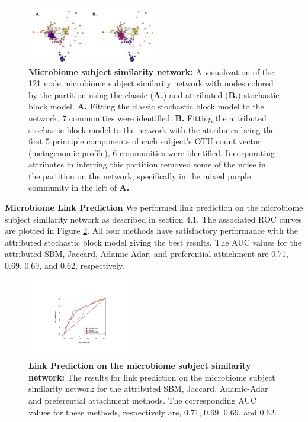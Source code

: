 \documentclass[10pt,journal,compsoc]{IEEEtran}
\begin{document}
\begin{figure}[h!]
\begin{center}
\includegraphics[width=0.5\textwidth]{MicrobiomeNets_Dec12.pdf}
\caption{{\bf Microbiome subject similarity network:} A visualization of the 121 node microbiome subject similarity network with nodes colored by the partition using the classic ({\bf A.}) and attributed ({\bf B.}) stochastic block model. {\bf A.} Fitting the classic stochastic block model to the network, 7 communities were identified. {\bf B.} Fitting the attributed stochastic block model to the network with the attributes being the first 5 principle components of each subject's OTU count vector (metagenomic profile), 6 communities were identified. Incorporating attributes in inferring this partition removed some of the noise in the partition on the network, specifically in the mixed purple community in the left of {\bf A.}}
\label{Fig4}
\end{center}
\end{figure}

{\bf Microbiome Link Prediction}
We performed link prediction on the microbiome subject similarity network as described in section 4.1. The associated ROC curves are plotted in Figure \ref{Fig5}. All four methods have satisfactory performance with the attributed stochastic block model giving the best results. The AUC values for the attributed SBM, Jaccard, Adamic-Adar, and preferential attachment are 0.71, 0.69, 0.69, and 0.62, respectively. 
 
\begin{figure}
\begin{center}
\includegraphics[width=0.4\textwidth]{ROC_Microbiome.pdf}
\caption{{\bf Link Prediction on the microbiome subject similarity network:} The results for link prediction on the microbiome subject similarity network for the attributed SBM, Jaccard, Adamic-Adar and preferential attachment methods. The corresponding AUC values for these methods, respectively are, 0.71, 0.69, 0.69, and 0.62.}
\label{Fig5}
\end{center}
\end{figure}
\end{document}
